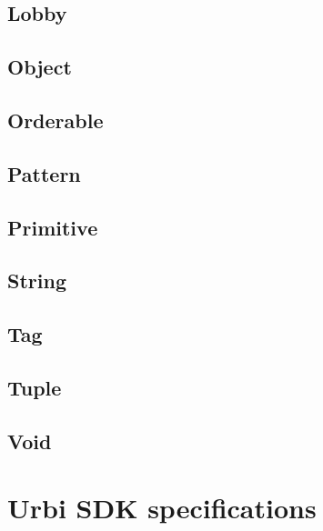 \documentclass[openright,twoside,12pt]{report}
\newcommand{\urbi}{Urbi\xspace}
\begin{document}
\section{Lobby}
\section{Object}
\section{Orderable}
\section{Pattern}
\section{Primitive}
\section{String}
\section{Tag}
\section{Tuple}
\section{Void}
\label{sect:std-void}

\chapter{\urbi SDK specifications}

\end{document}
